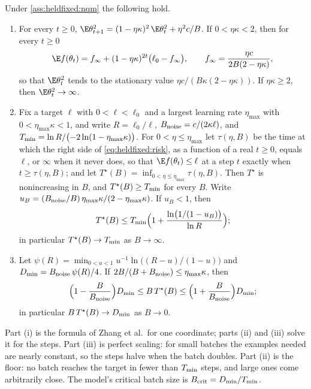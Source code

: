 \begin{refsection}
\begin{theorem}\label{thm:heldfixed:nqm}
Under \cref{ass:heldfixed:nqm} the following hold.
\begin{enumerate}
\item For every $t\ge0$, $\E\theta_{t+1}^2=(1-\eta\kappa)^2\,\E\theta_t^2+\eta^2c/B$. If $0<\eta\kappa<2$, then for every $t\ge0$
\begin{equation}\label{eq:heldfixed:risk}
\E f(\theta_t)=f_\infty+(1-\eta\kappa)^{2t}\bigl(\ell_0-f_\infty\bigr),\qquad f_\infty=\frac{\eta c}{2B(2-\eta\kappa)},
\end{equation}
so that $\E\theta_t^2$ tends to the stationary value $\eta c/(B\kappa(2-\eta\kappa))$. If $\eta\kappa\ge2$, then $\E\theta_t^2\to\infty$.
\item Fix a target $\ell$ with $0<\ell<\ell_0$ and a largest learning rate $\eta_{\max}$ with $0<\eta_{\max}\kappa<1$, and write $R=\ell_0/\ell$, $B_{\mathrm{noise}}=c/(2\kappa\ell)$, and $T_{\min}=\ln R/\bigl(-2\ln(1-\eta_{\max}\kappa)\bigr)$. For $0<\eta\le\eta_{\max}$ let $\tau(\eta,B)$ be the time at which the right side of \eqref{eq:heldfixed:risk}, as a function of a real $t\ge0$, equals $\ell$, or $\infty$ when it never does, so that $\E f(\theta_t)\le\ell$ at a step $t$ exactly when $t\ge\tau(\eta,B)$; and let $T^\star(B)=\inf_{0<\eta\le\eta_{\max}}\tau(\eta,B)$. Then $T^\star$ is nonincreasing in $B$, and $T^\star(B)\ge T_{\min}$ for every $B$. Write $u_B=(B_{\mathrm{noise}}/B)\,\eta_{\max}\kappa/(2-\eta_{\max}\kappa)$. If $u_B<1$, then
\[
T^\star(B)\le T_{\min}\Bigl(1+\frac{\ln\bigl(1/(1-u_B)\bigr)}{\ln R}\Bigr);
\]
in particular $T^\star(B)\to T_{\min}$ as $B\to\infty$.
\item Let $\psi(R)=\min_{0<u<1}u^{-1}\ln\bigl((R-u)/(1-u)\bigr)$ and $D_{\min}=B_{\mathrm{noise}}\,\psi(R)/4$. If $2B/(B+B_{\mathrm{noise}})\le\eta_{\max}\kappa$, then
\[
\Bigl(1-\frac B{B_{\mathrm{noise}}}\Bigr)D_{\min}\le B\,T^\star(B)\le\Bigl(1+\frac B{B_{\mathrm{noise}}}\Bigr)D_{\min} ;
\]
in particular $B\,T^\star(B)\to D_{\min}$ as $B\to0$.
\end{enumerate}
\end{theorem}

Part (i) is the formula of Zhang et al.\ for one coordinate; parts (ii) and (iii) solve it for the steps. Part (iii) is perfect scaling: for small batches the examples needed are nearly constant, so the steps halve when the batch doubles. Part (ii) is the floor: no batch reaches the target in fewer than $T_{\min}$ steps, and large ones come arbitrarily close. The model's critical batch size is $B_{\mathrm{crit}}=D_{\min}/T_{\min}$.


\end{refsection}
